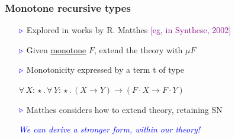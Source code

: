 \documentclass[11pt]{beamer}
\newcommand{\abs}[4]{{#1}\, #2\! : \! #3.\, #4}
\newcommand{\myb}[0]{\ensuremath{\textcolor{blue}{\triangleright}}}
\begin{document}
\begin{frame}
  \frametitle{Monotone recursive types}

  \begin{itemize}
  \item[$\myb$] Explored in works by R. Matthes \textcolor{purple}{[eg, in Synthese, 2002]}

\vspace{.1cm}

  \item[$\myb$] Given \underline{monotone} $F$, extend the theory with $\mu F$

\vspace{.1cm}

  \item[$\myb$] Monotonicity expressed by a term t of type

\vspace{.2cm}

    \hspace{.1cm} $ \abs{\forall}{X}{\star}{\abs{\forall}{Y}{\star}{(X \to Y) \to (F\cdot X \to F\cdot Y)}} $

\vspace{.1cm}

  \item[$\myb$] Matthes considers how to extend theory, retaining SN

    \pause

\vspace{1cm}

{\large
    \textcolor{blue}{\emph{We can derive a stronger form, within our theory!}}
}
  \end{itemize}
 \end{frame}
        
\end{document}
